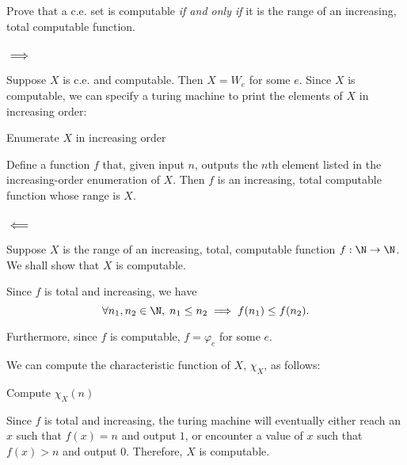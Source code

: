 \begin{problem}
  Prove that a c.e. set is computable \emph{if and only if} it is the
  range of an increasing, total computable function.

  \begin{answer}
    \subsubsection*{$\implies$}
      Suppose $X$ is c.e. and computable.
      Then $X = W_e$ for some $e$.
      Since $X$ is computable, we can specify a turing machine to print
      the elements of $X$ in increasing order:

      \step
      \begin{algorithm}[H]
        \caption{Enumerate $X$ in increasing order}
      \end{algorithm}

      \step
      Define a function $f$ that, given input $n$, outputs the $n$th element
      listed in the increasing-order enumeration of $X$.
      Then $f$ is an increasing, total computable function whose
      range is $X$.

    \subsubsection*{$\impliedby$}
      Suppose $X$ is the range of an increasing, total, computable function $f: \N \to \N$.
      We shall show that $X$ is computable.

      Since $f$ is total and increasing, we have
      \[ \forall n_1, n_2 \in \N,\; n_1 \leq n_2 \implies f(n_1) \leq f(n_2). \]

      Furthermore, since $f$ is computable, $f = \varphi_e$ for some $e$.

      We can compute the characteristic function of $X$, $\chi_X$, as follows:

      \begin{algorithm}[H]
        \caption{Compute $\chi_{X}(n)$}
      \end{algorithm}

      Since $f$ is total and increasing, the turing machine will eventually either
      reach an $x$ such that $f(x) = n$ and output $1$, or encounter a value
      of $x$ such that $f(x) > n$ and output $0$.
      Therefore, $X$ is computable.
  \end{answer}
\end{problem}
